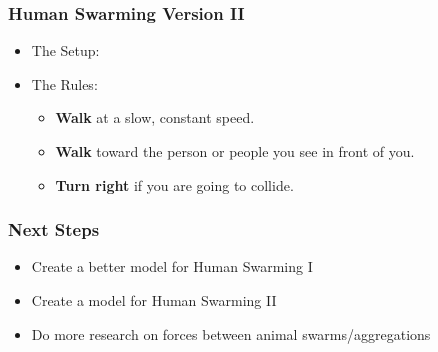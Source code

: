 \documentclass[xcolor=dvipsnames]{beamer}
\begin{document}
\begin{frame}
	\frametitle{Human Swarming Version II}
	\begin{multicols}{2}
	\begin{itemize}
	\item The Setup:
	\item The Rules:	
		\begin{itemize}
			\item \textbf{Walk} at a slow, constant speed.
			\item \textbf{Walk} toward the person or people you see in front of you.
			\item \textbf{Turn right} if you are going to collide.
		\end{itemize}
	\end{itemize}
	
	\end{multicols}
\end{frame}

\begin{frame}
	\frametitle{Next Steps}
	\begin{itemize}
		\item Create a better model for Human Swarming I
		\item Create a model for Human Swarming II
		\item Do more research on forces between animal swarms/aggregations
	\end{itemize}
\end{frame}

	
\end{document}
